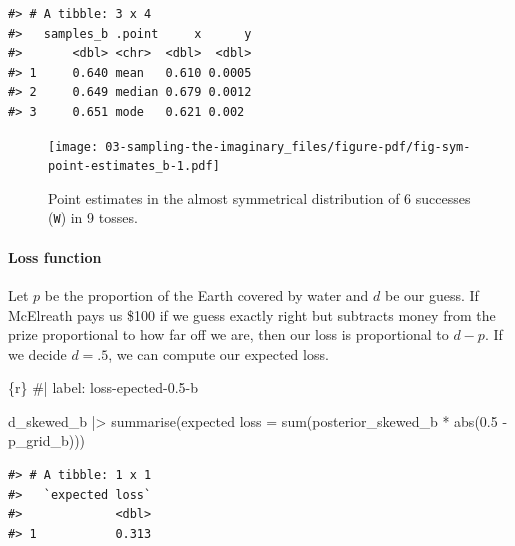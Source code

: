 \documentclass[
  letterpaper,
  DIV=11,
  numbers=noendperiod]{scrreprt}
\let\oldparagraph\paragraph
\renewcommand{\paragraph}[1]{\oldparagraph{#1}\mbox{}}
\newenvironment{Shaded}{\begin{snugshade}}{\end{snugshade}}
\newcommand{\AttributeTok}[1]{\textcolor[rgb]{0.40,0.45,0.13}{#1}}
\newcommand{\CommentTok}[1]{\textcolor[rgb]{0.37,0.37,0.37}{#1}}
\newcommand{\FloatTok}[1]{\textcolor[rgb]{0.68,0.00,0.00}{#1}}
\newcommand{\FunctionTok}[1]{\textcolor[rgb]{0.28,0.35,0.67}{#1}}
\newcommand{\InformationTok}[1]{\textcolor[rgb]{0.37,0.37,0.37}{#1}}
\newcommand{\NormalTok}[1]{\textcolor[rgb]{0.00,0.23,0.31}{#1}}
\newcommand{\OtherTok}[1]{\textcolor[rgb]{0.00,0.23,0.31}{#1}}
\newcommand{\SpecialCharTok}[1]{\textcolor[rgb]{0.37,0.37,0.37}{#1}}
\newcommand{\StringTok}[1]{\textcolor[rgb]{0.13,0.47,0.30}{#1}}
\begin{document}
\begin{verbatim}
#> # A tibble: 3 x 4
#>   samples_b .point     x      y
#>       <dbl> <chr>  <dbl>  <dbl>
#> 1     0.640 mean   0.610 0.0005
#> 2     0.649 median 0.679 0.0012
#> 3     0.651 mode   0.621 0.002
\end{verbatim}

\begin{figure}[H]

{\centering \texttt{[image: 03-sampling-the-imaginary\_files/figure-pdf/fig-sym-point-estimates\_b-1.pdf]}

}

\caption{\label{fig-sym-point-estimates_b}Point estimates in the almost
symmetrical distribution of 6 successes (\texttt{W}) in 9 tosses.}

\end{figure}

\hypertarget{loss-function-1}{%
\paragraph{Loss function}\label{loss-function-1}}

Let \(p\) be the proportion of the Earth covered by water and \(d\) be
our guess. If McElreath pays us \$100 if we guess exactly right but
subtracts money from the prize proportional to how far off we are, then
our loss is proportional to \(d - p\). If we decide \(d = .5\), we can
compute our expected loss.

\begin{Shaded}
\begin{Highlighting}[]
\InformationTok{\textasciigrave{}\textasciigrave{}\textasciigrave{}\{r\}}
\CommentTok{\#| label: loss{-}epected{-}0.5{-}b}

\NormalTok{d\_skewed\_b }\SpecialCharTok{|\textgreater{}} 
    \FunctionTok{summarise}\NormalTok{(}\StringTok{\textasciigrave{}}\AttributeTok{expected loss}\StringTok{\textasciigrave{}} \OtherTok{=} \FunctionTok{sum}\NormalTok{(posterior\_skewed\_b }\SpecialCharTok{*} \FunctionTok{abs}\NormalTok{(}\FloatTok{0.5} \SpecialCharTok{{-}}\NormalTok{ p\_grid\_b)))}
\InformationTok{\textasciigrave{}\textasciigrave{}\textasciigrave{}}
\end{Highlighting}
\end{Shaded}

\begin{verbatim}
#> # A tibble: 1 x 1
#>   `expected loss`
#>             <dbl>
#> 1           0.313
\end{verbatim}
\end{document}

